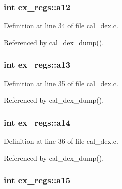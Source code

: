 \hypertarget{structex__regs_a3375d9f2f78cce316b6d6a7ddb4e55c4}{
\subsubsection[{a12}]{\setlength{\rightskip}{0pt plus 5cm}int ex\-\_\-regs\-::a12}}\label{structex__regs_a3375d9f2f78cce316b6d6a7ddb4e55c4}


Definition at line 34 of file cal\-\_\-dex.\-c.



Referenced by cal\-\_\-dex\-\_\-dump().

\hypertarget{structex__regs_a6d85cce0da676baba0080cb22ca81ee2}{
\subsubsection[{a13}]{\setlength{\rightskip}{0pt plus 5cm}int ex\-\_\-regs\-::a13}}\label{structex__regs_a6d85cce0da676baba0080cb22ca81ee2}


Definition at line 35 of file cal\-\_\-dex.\-c.



Referenced by cal\-\_\-dex\-\_\-dump().

\hypertarget{structex__regs_aec55873d79a2b12fb9c74e4db8071477}{
\subsubsection[{a14}]{\setlength{\rightskip}{0pt plus 5cm}int ex\-\_\-regs\-::a14}}\label{structex__regs_aec55873d79a2b12fb9c74e4db8071477}


Definition at line 36 of file cal\-\_\-dex.\-c.



Referenced by cal\-\_\-dex\-\_\-dump().

\hypertarget{structex__regs_ab9f5db40e8ea16e1c55093a7ef374342}{
\subsubsection[{a15}]{\setlength{\rightskip}{0pt plus 5cm}int ex\-\_\-regs\-::a15}}\label{structex__regs_ab9f5db40e8ea16e1c55093a7ef374342}


